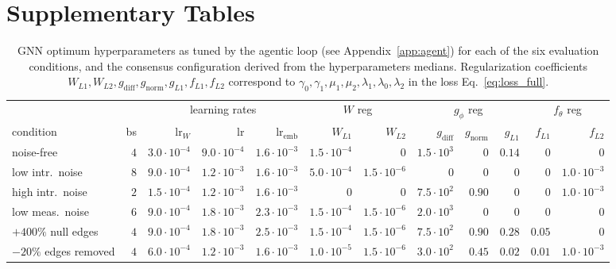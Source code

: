 \documentclass{article}
\begin{document}
{\small


}



\appendix

\newpage
\section{Supplementary Tables}

\begin{table}[h!]
\centering
\caption{GNN optimum hyperparameters as tuned by the agentic loop
(see Appendix~\ref{app:agent}) for each of the six evaluation
conditions, and the consensus configuration derived from
the hyperparameters medians. Regularization coefficients $W_{L1},W_{L2},g_{\text{diff}},
g_{\text{norm}},g_{L1},f_{L1},f_{L2}$ correspond to $\gamma_0,\gamma_1,
\mu_1,\mu_2,\lambda_1,\lambda_0,\lambda_2$ in the loss 
Eq.~\ref{eq:loss_full}.}
\label{tab:unified_hp}
\tiny
\setlength{\tabcolsep}{3pt}
\begin{tabular}{lrrrrrrrrrrr}
\toprule
 & & \multicolumn{3}{c}{learning rates} & \multicolumn{2}{c}{$W$ reg} & \multicolumn{3}{c}{$g_\phi$ reg} & \multicolumn{2}{c}{$f_\theta$ reg} \\
condition & bs
  & $\text{lr}_W$ & lr & $\text{lr}_{\text{emb}}$
  & $W_{L1}$ & $W_{L2}$
  & $g_{\text{diff}}$ & $g_{\text{norm}}$ & $g_{L1}$
  & $f_{L1}$ & $f_{L2}$ \\
\midrule
noise-free            & $4$
  & $3.0{\cdot}10^{-4}$ & $9.0{\cdot}10^{-4}$ & $1.6{\cdot}10^{-3}$
  & $1.5{\cdot}10^{-4}$ & $0$
  & $1.5{\cdot}10^{3}$  & $0$     & $0.14$
  & $0$    & $0$          \\
low intr.\ noise      & $8$
  & $9.0{\cdot}10^{-4}$ & $1.2{\cdot}10^{-3}$ & $1.6{\cdot}10^{-3}$
  & $5.0{\cdot}10^{-4}$ & $1.5{\cdot}10^{-6}$
  & $0$                 & $0$     & $0$
  & $0$    & $1.0{\cdot}10^{-3}$ \\
high intr.\ noise     & $2$
  & $1.5{\cdot}10^{-4}$ & $1.2{\cdot}10^{-3}$ & $1.6{\cdot}10^{-3}$
  & $0$                 & $0$
  & $7.5{\cdot}10^{2}$  & $0.90$  & $0$
  & $0$    & $1.0{\cdot}10^{-3}$ \\
low meas.\ noise      & $6$
  & $9.0{\cdot}10^{-4}$ & $1.8{\cdot}10^{-3}$ & $2.3{\cdot}10^{-3}$
  & $1.5{\cdot}10^{-4}$ & $1.5{\cdot}10^{-6}$
  & $2.0{\cdot}10^{3}$  & $0$     & $0$
  & $0$    & $0$          \\
$+400\%$ null edges   & $4$
  & $9.0{\cdot}10^{-4}$ & $1.8{\cdot}10^{-3}$ & $2.5{\cdot}10^{-3}$
  & $1.5{\cdot}10^{-4}$ & $1.5{\cdot}10^{-6}$
  & $7.5{\cdot}10^{2}$  & $0.90$  & $0.28$
  & $0.05$ & $0$          \\
$-20\%$ edges removed & $4$
  & $6.0{\cdot}10^{-4}$ & $1.2{\cdot}10^{-3}$ & $1.6{\cdot}10^{-3}$
  & $1.0{\cdot}10^{-5}$ & $1.5{\cdot}10^{-6}$
  & $3.0{\cdot}10^{2}$  & $0.45$  & $0.02$
  & $0.01$ & $1.0{\cdot}10^{-3}$ \\
\bottomrule
\end{tabular}
\end{table}
\end{document}
